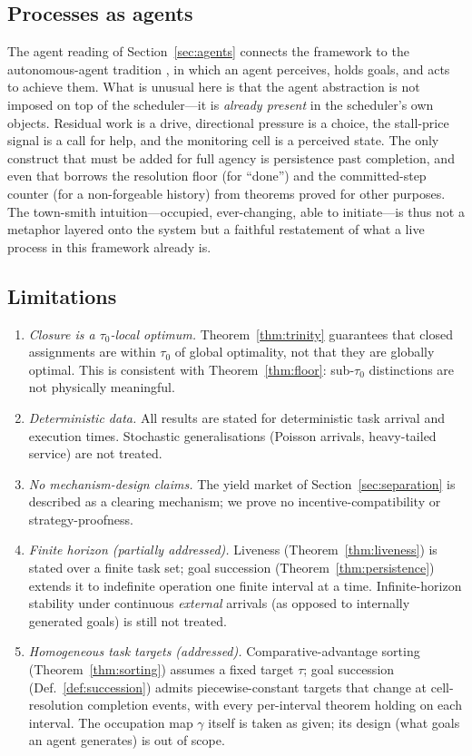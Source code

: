\documentclass[11pt,twocolumn,a4paper]{article}
\theoremstyle{plain}
\theoremstyle{definition}
\theoremstyle{remark}
\newcommand{\tick}{\tau_0}
\begin{document}
\subsection{Processes as agents}

The agent reading of Section~\ref{sec:agents} connects the framework to the
autonomous-agent tradition \cite{russell2020}, in which an agent perceives, holds
goals, and acts to achieve them. What is unusual here is that the agent abstraction
is not imposed on top of the scheduler---it is \emph{already present} in the
scheduler's own objects. Residual work is a drive, directional pressure is a choice,
the stall-price signal is a call for help, and the monitoring cell is a perceived
state. The only construct that must be added for full agency is persistence past
completion, and even that borrows the resolution floor (for ``done'') and the
committed-step counter (for a non-forgeable history) from theorems proved for other
purposes. The town-smith intuition---occupied, ever-changing, able to initiate---is
thus not a metaphor layered onto the system but a faithful restatement of what a
live process in this framework already is.

\subsection{Limitations}

\begin{enumerate}[nosep]
\item \emph{Closure is a $\tick$-local optimum.} Theorem~\ref{thm:trinity} guarantees that closed assignments are within $\tick$ of global optimality, not that they are globally optimal. This is consistent with Theorem~\ref{thm:floor}: sub-$\tick$ distinctions are not physically meaningful.
\item \emph{Deterministic data.} All results are stated for deterministic task arrival and execution times. Stochastic generalisations (Poisson arrivals, heavy-tailed service) are not treated.
\item \emph{No mechanism-design claims.} The yield market of Section~\ref{sec:separation} is described as a clearing mechanism; we prove no incentive-compatibility or strategy-proofness.
\item \emph{Finite horizon (partially addressed).} Liveness (Theorem~\ref{thm:liveness}) is stated over a finite task set; goal succession (Theorem~\ref{thm:persistence}) extends it to indefinite operation one finite interval at a time. Infinite-horizon stability under continuous \emph{external} arrivals (as opposed to internally generated goals) is still not treated.
\item \emph{Homogeneous task targets (addressed).} Comparative-advantage sorting (Theorem~\ref{thm:sorting}) assumes a fixed target $\tau$; goal succession (Def.~\ref{def:succession}) admits piecewise-constant targets that change at cell-resolution completion events, with every per-interval theorem holding on each interval. The occupation map $\gamma$ itself is taken as given; its design (what goals an agent generates) is out of scope.
\end{enumerate}
\end{document}
